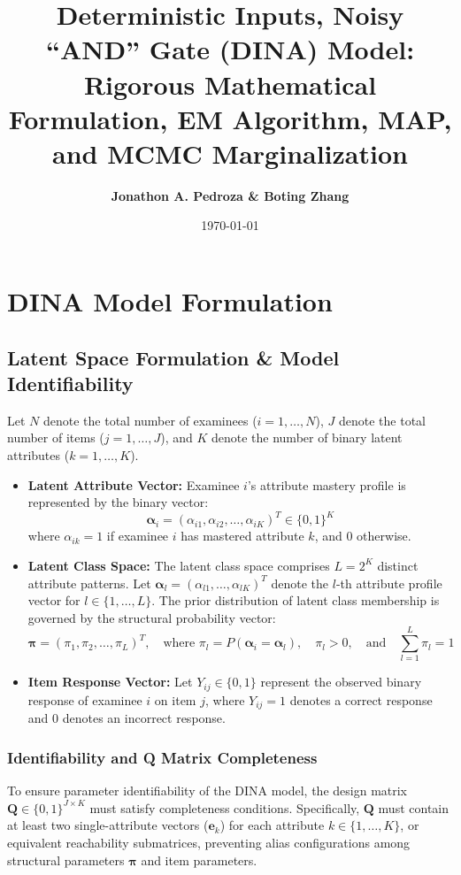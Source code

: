 \documentclass[11pt,a4paper]{article}
\title{\textbf{Deterministic Inputs, Noisy ``AND'' Gate (DINA) Model: Rigorous Mathematical Formulation, EM Algorithm, MAP, and MCMC Marginalization}}
\author{\textbf{Jonathon A. Pedroza \& Boting Zhang}}
\date{\today}
\begin{document}
\maketitle

\section{DINA Model Formulation}
\subsection{Latent Space Formulation \& Model Identifiability}

Let $N$ denote the total number of examinees ($i = 1, \dots, N$), $J$ denote the total number of items ($j = 1, \dots, J$), and $K$ denote the number of binary latent attributes ($k = 1, \dots, K$).

\begin{itemize}
    \item \textbf{Latent Attribute Vector:} Examinee $i$'s attribute mastery profile is represented by the binary vector:
    \begin{equation}
        \boldsymbol{\alpha}_i = (\alpha_{i1}, \alpha_{i2}, \dots, \alpha_{iK})^T \in \{0, 1\}^K
    \end{equation}
    where $\alpha_{ik} = 1$ if examinee $i$ has mastered attribute $k$, and $0$ otherwise.

    \item \textbf{Latent Class Space:} The latent class space comprises $L = 2^K$ distinct attribute patterns. Let $\boldsymbol{\alpha}_l = (\alpha_{l1}, \dots, \alpha_{lK})^T$ denote the $l$-th attribute profile vector for $l \in \{1, \dots, L\}$. The prior distribution of latent class membership is governed by the structural probability vector:
    \begin{equation}
        \boldsymbol{\pi} = (\pi_1, \pi_2, \dots, \pi_L)^T, \quad \text{where } \pi_l = P(\boldsymbol{\alpha}_i = \boldsymbol{\alpha}_l), \quad \pi_l > 0, \quad \text{and} \quad \sum_{l=1}^L \pi_l = 1
    \end{equation}

    \item \textbf{Item Response Vector:} Let $Y_{ij} \in \{0, 1\}$ represent the observed binary response of examinee $i$ on item $j$, where $Y_{ij} = 1$ denotes a correct response and $0$ denotes an incorrect response.
\end{itemize}

\subsubsection{Identifiability and Q Matrix Completeness}
To ensure parameter identifiability of the DINA model, the design matrix $\mathbf{Q} \in \{0, 1\}^{J \times K}$ must satisfy completeness conditions. Specifically, $\mathbf{Q}$ must contain at least two single-attribute vectors ($\mathbf{e}_k$) for each attribute $k \in \{1, \dots, K\}$, or equivalent reachability submatrices, preventing alias configurations among structural parameters $\boldsymbol{\pi}$ and item parameters.
\end{document}
